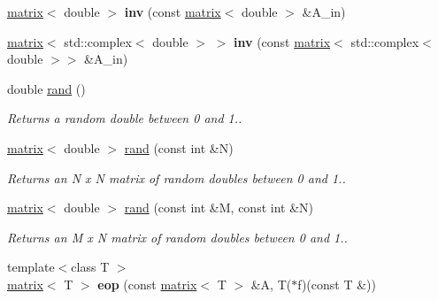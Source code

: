 \begin{DoxyCompactItemize}
\item 
\hypertarget{namespacekeycpp_adc96927cda2df7a6e8e2031941c43601}{\hyperlink{classkeycpp_1_1matrix}{matrix}$<$ double $>$ {\bfseries inv} (const \hyperlink{classkeycpp_1_1matrix}{matrix}$<$ double $>$ \&A\-\_\-in)}\label{namespacekeycpp_adc96927cda2df7a6e8e2031941c43601}

\item 
\hypertarget{namespacekeycpp_a6b74369f5415c3ed45f63995149ad992}{\hyperlink{classkeycpp_1_1matrix}{matrix}$<$ std\-::complex$<$ double $>$ $>$ {\bfseries inv} (const \hyperlink{classkeycpp_1_1matrix}{matrix}$<$ std\-::complex$<$ double $>$$>$ \&A\-\_\-in)}\label{namespacekeycpp_a6b74369f5415c3ed45f63995149ad992}

\item 
\hypertarget{namespacekeycpp_a5ef5c1f5951e8182a7c4ec9612f3f7e1}{double \hyperlink{namespacekeycpp_a5ef5c1f5951e8182a7c4ec9612f3f7e1}{rand} ()}\label{namespacekeycpp_a5ef5c1f5951e8182a7c4ec9612f3f7e1}

\begin{DoxyCompactList}\small\item\em Returns a random double between 0 and 1.. \end{DoxyCompactList}\item 
\hypertarget{namespacekeycpp_ae5c6c79ad914131dfc2b0ae22c6d5017}{\hyperlink{classkeycpp_1_1matrix}{matrix}$<$ double $>$ \hyperlink{namespacekeycpp_ae5c6c79ad914131dfc2b0ae22c6d5017}{rand} (const int \&N)}\label{namespacekeycpp_ae5c6c79ad914131dfc2b0ae22c6d5017}

\begin{DoxyCompactList}\small\item\em Returns an N x N matrix of random doubles between 0 and 1.. \end{DoxyCompactList}\item 
\hypertarget{namespacekeycpp_a259b4e27cc4ec4d79d27688fdafcf2ca}{\hyperlink{classkeycpp_1_1matrix}{matrix}$<$ double $>$ \hyperlink{namespacekeycpp_a259b4e27cc4ec4d79d27688fdafcf2ca}{rand} (const int \&M, const int \&N)}\label{namespacekeycpp_a259b4e27cc4ec4d79d27688fdafcf2ca}

\begin{DoxyCompactList}\small\item\em Returns an M x N matrix of random doubles between 0 and 1.. \end{DoxyCompactList}\item 
\hypertarget{namespacekeycpp_aae90693acdaf666bd23bf861f2c0d28c}{{\footnotesize template$<$class T $>$ }\\\hyperlink{classkeycpp_1_1matrix}{matrix}$<$ T $>$ {\bfseries eop} (const \hyperlink{classkeycpp_1_1matrix}{matrix}$<$ T $>$ \&A, T($\ast$f)(const T \&))}\label{namespacekeycpp_aae90693acdaf666bd23bf861f2c0d28c}


\end{DoxyCompactItemize}
